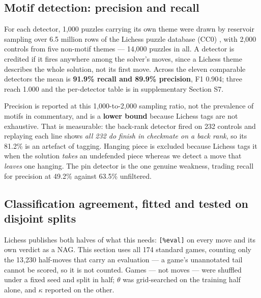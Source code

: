 \documentclass[conference]{IEEEtran}
\begin{document}
\subsection{Motif detection: precision and recall}

For each detector, 1,000 puzzles carrying its own theme were drawn by
reservoir sampling over 6.5 million rows of the Lichess puzzle database
(CC0) \cite{lichessdb}, with 2,000 controls from five non-motif themes ---
14,000 puzzles in all. A detector is credited if it fires anywhere among the
solver's moves, since a Lichess theme describes the whole solution, not its
first move. Across the eleven comparable detectors the mean is
\textbf{91.9\% recall and 89.9\% precision}, F1 0.904; three reach 1.000 and
the per-detector table is in supplementary Section S7.

Precision is reported at this 1,000-to-2,000 sampling ratio, not the
prevalence of motifs in commentary, and is a \textbf{lower bound} because
Lichess tags are not exhaustive. That is measurable: the back-rank detector
fired on 232 controls and replaying each line shows \emph{all 232 do finish
in checkmate on a back rank}, so its 81.2\% is an artefact of tagging.
Hanging piece is excluded because Lichess tags it when the solution
\emph{takes} an undefended piece whereas we detect a move that \emph{leaves}
one hanging. The pin detector is the one genuine weakness, trading recall
for precision at 49.2\% against 63.5\% unfiltered.

\subsection{Classification agreement, fitted and tested on disjoint splits}
\label{sec:agreement}

Lichess publishes both halves of what this needs: \texttt{[\%eval]} on every
move and its own verdict as a NAG. This section uses all 174 standard games,
counting only the 13,230 half-moves that carry an evaluation --- a game's
unannotated tail cannot be scored, so it is not counted. Games --- not moves
--- were shuffled under a fixed seed and split in half; $\theta$ was
grid-searched on the training half alone, and $\kappa$ reported on the
other.
\end{document}
